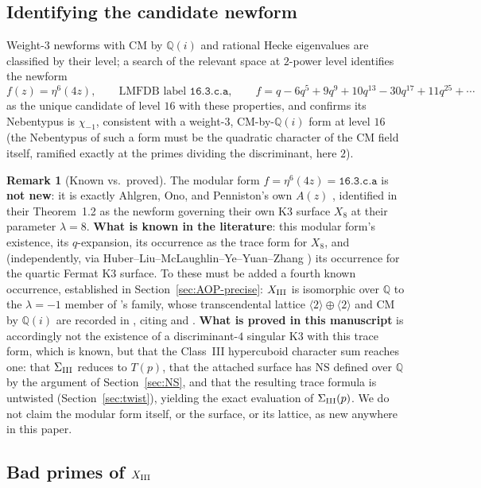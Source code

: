 \documentclass[11pt]{amsart}
\theoremstyle{definition}
\newtheorem{remark}[theorem]{Remark}
\newcommand{\Q}{\mathbb{Q}}
\newcommand{\NS}{\mathrm{NS}}
\begin{document}
\subsection{Identifying the candidate newform}

Weight-$3$ newforms with CM by $\Q(i)$ and rational Hecke eigenvalues are
classified by their level; a search of the relevant space at $2$-power
level identifies the newform
\[
f(z) = \eta^6(4z), \qquad \text{LMFDB label } \texttt{16.3.c.a},\qquad
f = q-6q^5+9q^9+10q^{13}-30q^{17}+11q^{25}+\cdots
\]
as the unique candidate of level $16$ with these properties, and confirms
its Nebentypus is $\chi_{-1}$, consistent with a weight-$3$, CM-by-$\Q(i)$
form at level $16$ (the Nebentypus of such a form must be the quadratic
character of the CM field itself, ramified exactly at the primes dividing
the discriminant, here $2$).

\begin{remark}[Known vs.\ proved]
\label{rem:known-vs-proved}
The modular form $f=\eta^6(4z)=\texttt{16.3.c.a}$ is \textbf{not new}: it
is exactly Ahlgren, Ono, and Penniston's own $A(z)$ \cite{AOP2002},
identified in their Theorem~1.2 as the newform governing their own K3
surface $X_8$ at their parameter $\lambda=8$. \textbf{What is known in
the literature}: this modular form's existence, its $q$-expansion, its
occurrence as the trace form for $X_8$, and (independently, via
Huber--Liu--McLaughlin--Ye--Yuan--Zhang \cite{Huber}) its occurrence for
the quartic Fermat K3 surface. To these must be added a fourth known
occurrence, established in Section~\ref{sec:AOP-precise}: $X_{\rm III}$ is
isomorphic over $\Q$ to the $\lambda=-1$ member of \cite{AOP2002}'s
family, whose transcendental lattice $\langle2\rangle\oplus\langle2\rangle$
and CM by $\Q(i)$ are recorded in \cite{vanGeemenTop2006}, citing
\cite{Persson1985} and \cite{ShiodaInose1977}. \textbf{What is proved in
this manuscript} is accordingly not the existence of a discriminant-$4$
singular K3 with this trace form, which is known, but that the Class~III
hypercuboid character sum reaches one: that $\Sigma_{\rm III}$ reduces to
$T(p)$, that the attached surface has $\NS$ defined over $\Q$ by the
argument of Section~\ref{sec:NS}, and that the resulting trace formula is
untwisted (Section~\ref{sec:twist}), yielding the exact evaluation of
$\Sigma_{\rm III}(p)$. We do not claim the modular form itself, or the
surface, or its lattice, as new anywhere in this paper.
\end{remark}

\subsection{Bad primes of $X_{\rm III}$}
\label{sec:badprimes}
\end{document}
